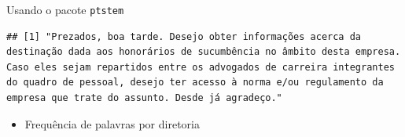 \documentclass[]{article}
\newenvironment{Shaded}{\begin{snugshade}}{\end{snugshade}}
\newcommand{\KeywordTok}[1]{\textcolor[rgb]{0.13,0.29,0.53}{\textbf{#1}}}
\newcommand{\DataTypeTok}[1]{\textcolor[rgb]{0.13,0.29,0.53}{#1}}
\newcommand{\DecValTok}[1]{\textcolor[rgb]{0.00,0.00,0.81}{#1}}
\newcommand{\StringTok}[1]{\textcolor[rgb]{0.31,0.60,0.02}{#1}}
\newcommand{\CommentTok}[1]{\textcolor[rgb]{0.56,0.35,0.01}{\textit{#1}}}
\newcommand{\OtherTok}[1]{\textcolor[rgb]{0.56,0.35,0.01}{#1}}
\newcommand{\OperatorTok}[1]{\textcolor[rgb]{0.81,0.36,0.00}{\textbf{#1}}}
\newcommand{\NormalTok}[1]{#1}
\providecommand{\tightlist}{%
  \setlength{\itemsep}{0pt}\setlength{\parskip}{0pt}}
\begin{document}
Usando o pacote \texttt{ptstem}

\begin{Shaded}
\end{Shaded}

\begin{verbatim}
## [1] "Prezados, boa tarde. Desejo obter informações acerca da destinação dada aos honorários de sucumbência no âmbito desta empresa. Caso eles sejam repartidos entre os advogados de carreira integrantes do quadro de pessoal, desejo ter acesso à norma e/ou regulamento da empresa que trate do assunto. Desde já agradeço."
\end{verbatim}

\begin{Shaded}
\end{Shaded}

\begin{itemize}
\tightlist
\item
  Frequência de palavras por diretoria
\end{itemize}

\begin{Shaded}
\end{Shaded}
\end{document}
